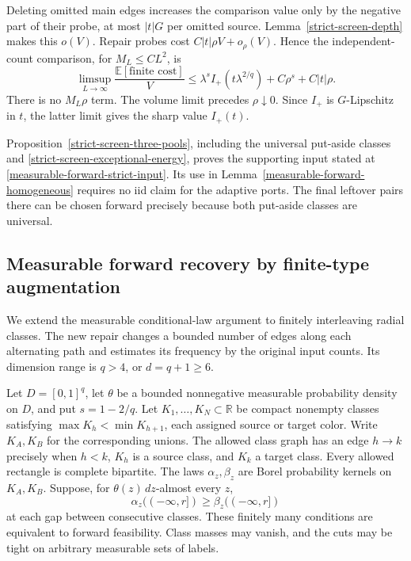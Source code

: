\documentclass[11pt,reqno]{amsart}
\theoremstyle{definition}
\theoremstyle{remark}
\numberwithin{equation}{section}
\newcommand{\R}{\mathbb R}
\newcommand{\E}{\mathbb E}
\begin{document}
Deleting omitted main edges increases the comparison value only by the
negative part of their probe, at most \(|t|G\) per omitted source.
Lemma~\ref{strict-screen-depth} makes this \(o(V)\). Repair probes cost
\(C|t|\rho V+o_\rho(V)\). Hence the independent-count comparison, for
\(M_L\le CL^2\), is
\begin{equation}
\label{strict-screen-poisson-upper}
 \limsup_{L\to\infty}\frac{\E[\text{finite cost}]}V
 \le\lambda^s I_+(t\lambda^{2/q})+C\rho^s+C|t|\rho.
\end{equation}
There is no \(M_L\rho\) term. The volume limit precedes
\(\rho\downarrow0\). Since \(I_+\) is \(G\)-Lipschitz in \(t\), the latter
limit gives the sharp value \(I_+(t)\).

Proposition~\ref{strict-screen-three-pools}, including the universal
put-aside classes and \eqref{strict-screen-exceptional-energy}, proves the
supporting input stated at \ref{measurable-forward-strict-input}.
Its use in Lemma~\ref{measurable-forward-homogeneous} requires no iid
claim for the adaptive ports. The final leftover pairs there can be
chosen forward precisely because both put-aside classes are universal.

\subsection{Measurable forward recovery by finite-type augmentation}
\label{measurable-forward-section}

We extend the measurable conditional-law argument to finitely interleaving
radial classes. The new repair changes a bounded number of edges along
each alternating path and estimates its frequency by the original input
counts. Its dimension range is \(q>4\), or \(d=q+1\ge6\).

Let \(D=[0,1]^q\), let \(\theta\) be a bounded nonnegative measurable
probability density on \(D\), and put \(s=1-2/q\). Let
\(K_1,\ldots,K_N\subset\R\) be compact nonempty classes satisfying
\(\max K_h<\min K_{h+1}\), each assigned source or target color.
Write \(K_A,K_B\) for the corresponding unions. The allowed class graph
has an edge \(h\to k\) precisely when \(h<k\), \(K_h\) is a source
class, and \(K_k\) a target class. Every allowed rectangle is complete
bipartite. The laws \(\alpha_z,\beta_z\) are Borel probability kernels
on \(K_A,K_B\). Suppose, for \(\theta(z)\,dz\)-almost every \(z\),
\begin{equation}
\label{measurable-forward-hall}
 \alpha_z((-\infty,r])\ge\beta_z((-\infty,r])
\end{equation}
at each gap between consecutive classes. These finitely many conditions
are equivalent to forward feasibility. Class masses may vanish, and
the cuts may be tight on arbitrary measurable sets of labels.
\end{document}
